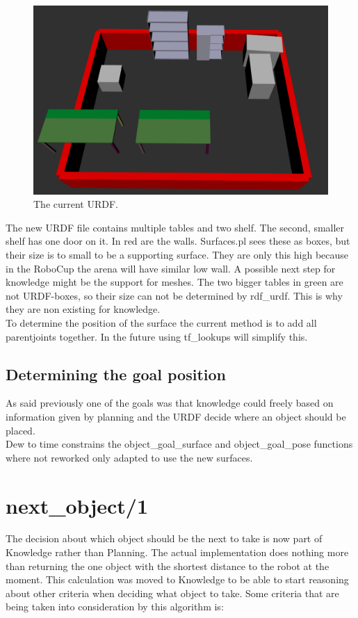 \documentclass[main.tex]{subfiles}
\begin{document}
		\begin{figure}[H]
		\centering
		\includegraphics[width=0.7\linewidth]{pictures/knowledge_urdf.png}
		\caption{The current URDF.}
		\label{fig:knowledge_urdf}
		\end{figure}
		
		The new URDF file contains multiple tables and two shelf. The second, smaller shelf has  one door on it. In red are the walls. Surfaces.pl sees these as boxes, but their size is to small to be a supporting surface. They are only this high because in the RoboCup the arena will have similar low wall. A possible next step for knowledge might be the support for meshes. The two bigger tables in green are not URDF-boxes, so their size can not be determined by rdf\_urdf. This is why they are non existing for knowledge.\\
		To determine the position of the surface the current method is to add all parentjoints together. In the future using tf\_lookups will  simplify this.
		
		\subsection{Determining the goal position}
		
		As said previously one of the goals was that knowledge could freely based on information given by planning and the URDF decide where an object should be placed.\\
		Dew to time constrains the object\_goal\_surface and object\_goal\_pose functions where not reworked only adapted to use the new surfaces.
		
		

		\section{next\_object/1}
		The decision about which object should be the next to take is now part of Knowledge rather than Planning. The actual implementation does nothing more than returning the one object with the shortest distance to the robot at the moment. This calculation was moved to Knowledge to be able to start reasoning about other criteria when deciding what object to take. Some criteria that are being taken into consideration by this algorithm is:
		
\end{document}
